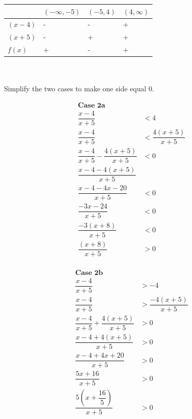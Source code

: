 \documentclass[12pt]{book}
\begin{document}
\begin{enumerate}
\begin{tabularx}{0.8\textwidth} { 
  | >{\raggedright\arraybackslash}X 
  | >{\centering\arraybackslash}X 
  | >{\centering\arraybackslash}X 
  | >{\raggedleft\arraybackslash}X | }
 \hline
  & $(-\infty, -5)$ & $(-5, 4)$ & $(4, \infty)$ \\
 \hline
 $(x-4)$ & - & - & + \\
 \hline
 $(x+5)$ & - & + & + \\
 \hline
 $f(x)$ & + & - & + \\
 \hline
\end{tabularx}\\\\

Simplify the two cases to make one side equal 0.
\newpage

\begingroup
\addtolength{\jot}{0.8em}
\begin{minipage}{.5\textwidth}
    \begin{align*}
    \textbf{Case 2a}\\
        \dfrac{x-4}{x+5} &< 4 \\
        \dfrac{x-4}{x+5} &< \dfrac{4(x+5)}{x+5} \\
        \dfrac{x-4}{x+5} - \dfrac{4(x+5)}{x+5} &< 0 \\
        \dfrac{x-4 - 4(x+5)}{x+5} \\
        \dfrac{x - 4 - 4x - 20}{x+5} &< 0 \\
        \dfrac{-3x-24}{x+5} &< 0 \\
        \dfrac{-3(x+8)}{x+5} &< 0 \\
        \dfrac{(x+8)}{x+5} &> 0 \\
    \end{align*}      
    \end{minipage}
    \begin{minipage}{.5\textwidth}
    \begin{align*}
    \textbf{Case 2b}\\
        \dfrac{x-4}{x+5} &> -4 \\
        \dfrac{x-4}{x+5} &> \dfrac{-4(x+5)}{x+5} \\
        \dfrac{x-4}{x+5}+\dfrac{4(x+5)}{x+5} &> 0 \\
        \dfrac{x-4+4(x+5)}{x+5} &> 0 \\
        \dfrac{x-4+4x+20}{x+5} &> 0 \\
        \dfrac{5x+16}{x+5} &> 0 \\
        \dfrac{5\left(x+\dfrac{16}{5}\right)}{x+5} &> 0 \\

\end{align*}
\end{minipage}
\end{enumerate}
\end{document}
